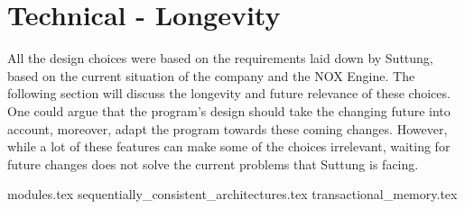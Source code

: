 \chapter{Technical - Longevity}
\label{chap:technical_longevity}
All the design choices were based on the requirements laid down by Suttung,
based on the current situation of the company and the NOX Engine.
The following section will discuss the longevity and future relevance of
these choices.
One could argue that the program's design should take the changing future into account, moreover, adapt the program towards these coming changes.
However, while a lot of these features can make some of the choices
irrelevant, waiting for future changes does not solve the current problems that
Suttung is facing.

{modules.tex}
{sequentially_consistent_architectures.tex}
{transactional_memory.tex}
